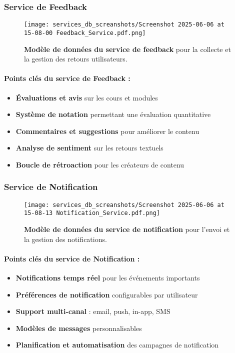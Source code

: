 \subsubsection{Service de Feedback}
\begin{figure}[h!]
  \centering
  \texttt{[image: services\_db\_screanshots/Screenshot 2025-06-06 at 15-08-00 Feedback\_Service.pdf.png]}
  \caption{\textbf{Modèle de données du service de feedback} pour la collecte et la gestion des retours utilisateurs.}
  \label{fig:feedback_service}
\end{figure}
\vspace{-10pt}
\small
\paragraph{Points clés du service de Feedback :}
\begin{itemize}[leftmargin=*,noitemsep,topsep=0pt]
  \item \textbf{Évaluations et avis} sur les cours et modules
  \item \textbf{Système de notation} permettant une évaluation quantitative
  \item \textbf{Commentaires et suggestions} pour améliorer le contenu
  \item \textbf{Analyse de sentiment} sur les retours textuels
  \item \textbf{Boucle de rétroaction} pour les créateurs de contenu
\end{itemize}
\normalsize
\newpage

\subsubsection{Service de Notification}
\begin{figure}[h!]
  \centering
  \texttt{[image: services\_db\_screanshots/Screenshot 2025-06-06 at 15-08-13 Notification\_Service.pdf.png]}
  \caption{\textbf{Modèle de données du service de notification} pour l'envoi et la gestion des notifications.}
  \label{fig:notification_service}
\end{figure}
\vspace{-10pt}
\small
\paragraph{Points clés du service de Notification :}
\begin{itemize}[leftmargin=*,noitemsep,topsep=0pt]
  \item \textbf{Notifications temps réel} pour les événements importants
  \item \textbf{Préférences de notification} configurables par utilisateur
  \item \textbf{Support multi-canal} : email, push, in-app, SMS
  \item \textbf{Modèles de messages} personnalisables
  \item \textbf{Planification et automatisation} des campagnes de notification
\end{itemize}
\normalsize
\newpage

